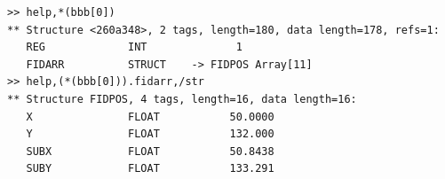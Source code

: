 \documentclass[10pt]{scrartcl}
\begin{document}
\begin{lstlisting}
>> help,*(bbb[0])
** Structure <260a348>, 2 tags, length=180, data length=178, refs=1:
   REG             INT              1
   FIDARR          STRUCT    -> FIDPOS Array[11]
>> help,(*(bbb[0])).fidarr,/str
** Structure FIDPOS, 4 tags, length=16, data length=16:
   X               FLOAT           50.0000
   Y               FLOAT           132.000
   SUBX            FLOAT           50.8438
   SUBY            FLOAT           133.291
\end{lstlisting}
\end{document}
